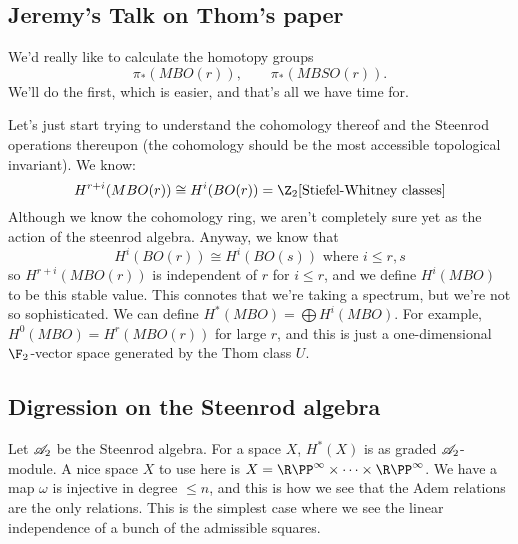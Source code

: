 \documentclass[11pt]{article}
\newcommand{\KanSemResponse}[1]
{
\thispagestyle{fancy}
\subsection*{#1}
}
\begin{document}
\begin{JeremyThomTalk}
\KanSemResponse
{Jeremy's Talk on Thom's paper}
\renewcommand{\Steen}{\scrA_2}
We'd really like to calculate the homotopy groups
\[\pi_*({MBO}(r)),\qquad \pi_*({MBSO}(r)).\]
We'll do the first, which is easier, and that's all we have time for.

Let's just start trying to understand the cohomology thereof and the Steenrod operations thereupon (the cohomology should be the most accessible topological invariant). We know: 
\[H^{r+i}(MBO(r))\cong H^i(BO(r))=\Z_2[\text{Stiefel-Whitney classes}]\]
Although we know the cohomology ring, we aren't completely sure yet as the action of the steenrod algebra. Anyway, we know that
\[H^i(BO(r))\cong H^i(BO(s))\text{ where $i\leq r,s$}\]
so $H^{r+i}(MBO(r))$ is independent of $r$ for $i\leq r$, and we define $H^i(MBO)$ to be this stable value. This connotes that we're taking a spectrum, but we're not so sophisticated. We can define $H^*(MBO)=\bigoplus H^i(MBO)$. For example, $H^0(MBO)=H^r(MBO(r))$ for large $r$, and this is just a one-dimensional $\F_2$-vector space generated by the Thom class $U$.

\subsection*{Digression on the Steenrod algebra}
Let $\Steen$ be the Steenrod algebra. For a space $X$, $H^*(X)$ is as graded $\Steen$-module. A nice space $X$ to use here is $X=\RP^\infty\times\cdots\times\RP^\infty$. We have a map
\funcdef{\omega:\Steen}{H^*(X)}{a}{a(u_1\otimes\cdots\otimes u_n)}
$\omega$ is injective in degree $\leq n$, and this is how we see that the Adem relations are the only relations. This is the simplest case where we see the linear independence of a bunch of the admissible squares.


\end{JeremyThomTalk}
\end{document}
